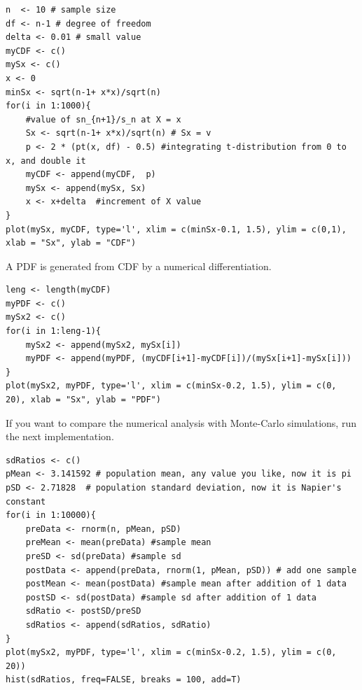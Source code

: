 \documentclass[10pt]{article}
\begin{document}
\begin{lstlisting}[caption=CDF that $s_{n+1} > v s_n$,  label=densityFunctions]
n  <- 10 # sample size
df <- n-1 # degree of freedom
delta <- 0.01 # small value
myCDF <- c()
mySx <- c()
x <- 0
minSx <- sqrt(n-1+ x*x)/sqrt(n)
for(i in 1:1000){
	#value of sn_{n+1}/s_n at X = x
	Sx <- sqrt(n-1+ x*x)/sqrt(n) # Sx = v
	p <- 2 * (pt(x, df) - 0.5) #integrating t-distribution from 0 to x, and double it
	myCDF <- append(myCDF,  p)
	mySx <- append(mySx, Sx)
	x <- x+delta  #increment of X value
}
plot(mySx, myCDF, type='l', xlim = c(minSx-0.1, 1.5), ylim = c(0,1), xlab = "Sx", ylab = "CDF")
\end{lstlisting}

A PDF is generated from CDF by a numerical differentiation. 
\begin{lstlisting}[caption=PDF that $s_{n+1} > v s_n$, label=fuga2]
leng <- length(myCDF)
myPDF <- c()
mySx2 <- c()
for(i in 1:leng-1){
	mySx2 <- append(mySx2, mySx[i])
	myPDF <- append(myPDF, (myCDF[i+1]-myCDF[i])/(mySx[i+1]-mySx[i]))
}
plot(mySx2, myPDF, type='l', xlim = c(minSx-0.2, 1.5), ylim = c(0, 20), xlab = "Sx", ylab = "PDF")
\end{lstlisting}

If you want to compare the numerical analysis with Monte-Carlo simulations, run the next implementation. 
\begin{lstlisting}[caption=Monte-Carlo simulation, label=fuga2]
sdRatios <- c()
pMean <- 3.141592 # population mean, any value you like, now it is pi
pSD <- 2.71828  # population standard deviation, now it is Napier's constant
for(i in 1:10000){
	preData <- rnorm(n, pMean, pSD)
	preMean <- mean(preData) #sample mean
	preSD <- sd(preData) #sample sd
	postData <- append(preData, rnorm(1, pMean, pSD)) # add one sample
	postMean <- mean(postData) #sample mean after addition of 1 data
	postSD <- sd(postData) #sample sd after addition of 1 data
	sdRatio <- postSD/preSD
	sdRatios <- append(sdRatios, sdRatio)
}
plot(mySx2, myPDF, type='l', xlim = c(minSx-0.2, 1.5), ylim = c(0, 20))
hist(sdRatios, freq=FALSE, breaks = 100, add=T) 
\end{lstlisting}


\newpage
\end{document}
